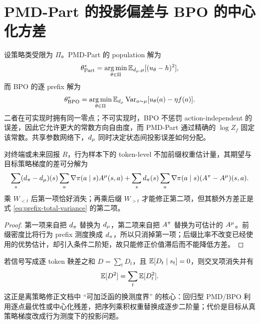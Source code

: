 \section{PMD-Part 的投影偏差与 BPO 的中心化方差}

设策略类受限为 $\Pi$。PMD-Part 的 population 解为
\begin{equation}
\theta_{\rm Part}^*=\operatorname*{arg\,min}_{\theta\in\Pi}\mathbb{E}_{d_\mu,\mu}[(u_\theta-h)^2],
\end{equation}
而 BPO 的逐 prefix 解为
\begin{equation}
\theta_{\rm BPO}^*=\operatorname*{arg\,min}_{\theta\in\Pi}\mathbb{E}_{d_\mu}\operatorname{Var}_{a\sim\mu}[u_\theta(a)-\eta f(a)].
\end{equation}
二者在可实现时拥有同一零点；不可实现时，BPO 不惩罚 action-independent 的误差，因此它允许更大的常数方向自由度，而 PMD-Part 通过精确的 $\log Z_f$ 固定该常数。共享参数网络下，$d_\mu$ 同时决定状态间投影误差如何分配。

\begin{proposition}
\label{prop:prefix-bias-variance}
对终端或未来回报 $R$，行为样本下的 token-level 不加前缀权重估计量，其期望与目标策略梯度的差可分解为
\begin{equation}
\sum_s(d_\pi-d_\mu)(s)\sum_a\nabla\pi(a\mid s)A^\mu(s,a)
+\sum_s d_\pi(s)\sum_a\nabla\pi(a\mid s)(A^\pi-A^\mu)(s,a).
\end{equation}
乘 $W_{<t}$ 后第一项恰好消失；再乘后缀 $W_{>t}$ 才能修正第二项，但其额外方差正是式 \eqref{eq:prefix-total-variance} 的第二项。
\end{proposition}

\begin{proof}
第一项来自把 $d_\pi$ 替换为 $d_\mu$，第二项来自把 $A^\pi$ 替换为可估计的 $A^\mu$。前缀密度比将行为 prefix 测度换成 $d_\pi$，所以只消掉第一项；后缀比率不改变已经使用的优势估计，却引入条件二阶矩，故只能修正价值滞后而不能降低方差。
\end{proof}

\begin{remark}[可加残差为何能绕开乘积]
若信号写成逐 token 鞅差之和 $D=\sum_tD_t$，且 $\mathbb{E}[D_t\mid s_t]=0$，则交叉项消失并有
\begin{equation}
\mathbb{E}[D^2]=\sum_t\mathbb{E}[D_t^2].
\end{equation}
这正是离策略修正文档中 ``可加泛函的换测度界'' 的核心：回归型 PMD/BPO 利用逐点最优性或中心化残差，把序列乘积权重替换成逐步二阶量；代价是目标从真策略梯度改成行为测度下的投影问题。

\end{remark}

